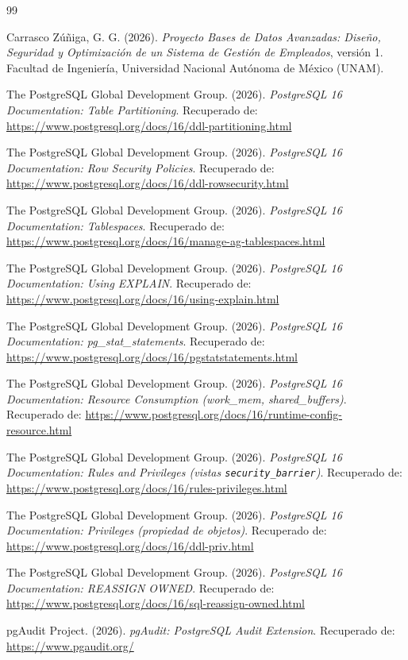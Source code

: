 \documentclass[12pt,a4paper]{article}
\begin{document}
\begin{thebibliography}{99}

Carrasco Zúñiga, G. G. (2026).
\emph{Proyecto Bases de Datos Avanzadas: Diseño, Seguridad y Optimización de un Sistema de Gestión de Empleados}, versión 1.
Facultad de Ingeniería, Universidad Nacional Autónoma de México (UNAM).

The PostgreSQL Global Development Group. (2026).
\emph{PostgreSQL 16 Documentation: Table Partitioning}.
Recuperado de: \url{https://www.postgresql.org/docs/16/ddl-partitioning.html}

The PostgreSQL Global Development Group. (2026).
\emph{PostgreSQL 16 Documentation: Row Security Policies}.
Recuperado de: \url{https://www.postgresql.org/docs/16/ddl-rowsecurity.html}

The PostgreSQL Global Development Group. (2026).
\emph{PostgreSQL 16 Documentation: Tablespaces}.
Recuperado de: \url{https://www.postgresql.org/docs/16/manage-ag-tablespaces.html}

The PostgreSQL Global Development Group. (2026).
\emph{PostgreSQL 16 Documentation: Using EXPLAIN}.
Recuperado de: \url{https://www.postgresql.org/docs/16/using-explain.html}

The PostgreSQL Global Development Group. (2026).
\emph{PostgreSQL 16 Documentation: pg\_\allowbreak{}stat\_\allowbreak{}statements}.
Recuperado de: \url{https://www.postgresql.org/docs/16/pgstatstatements.html}

The PostgreSQL Global Development Group. (2026).
\emph{PostgreSQL 16 Documentation: Resource Consumption (work\_\allowbreak{}mem, shared\_\allowbreak{}buffers)}.
Recuperado de: \url{https://www.postgresql.org/docs/16/runtime-config-resource.html}

The PostgreSQL Global Development Group. (2026).
\emph{PostgreSQL 16 Documentation: Rules and Privileges (vistas \texttt{security\_\allowbreak{}barrier})}.
Recuperado de: \url{https://www.postgresql.org/docs/16/rules-privileges.html}

The PostgreSQL Global Development Group. (2026).
\emph{PostgreSQL 16 Documentation: Privileges (propiedad de objetos)}.
Recuperado de: \url{https://www.postgresql.org/docs/16/ddl-priv.html}

The PostgreSQL Global Development Group. (2026).
\emph{PostgreSQL 16 Documentation: REASSIGN OWNED}.
Recuperado de: \url{https://www.postgresql.org/docs/16/sql-reassign-owned.html}

pgAudit Project. (2026).
\emph{pgAudit: PostgreSQL Audit Extension}.
Recuperado de: \url{https://www.pgaudit.org/}

\end{thebibliography}
\end{document}
